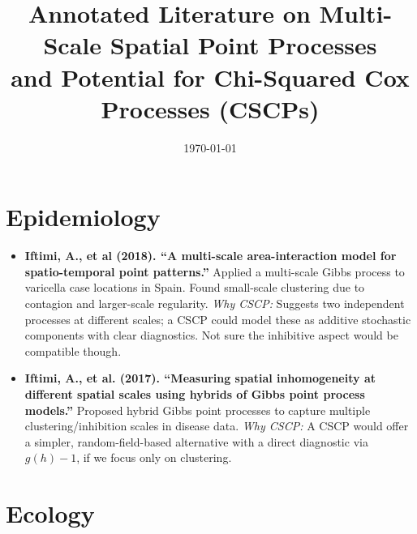 \documentclass[11pt]{article}
\title{Annotated Literature on Multi-Scale Spatial Point Processes \\ and Potential for Chi-Squared Cox Processes (CSCPs)}
\author{}
\date{\today}
\begin{document}
	\maketitle
	
	\section*{Epidemiology}
	
	\begin{itemize}
		\item \textbf{Iftimi, A., et al (2018). ``A multi-scale area-interaction model for spatio-temporal point patterns.''}  
		Applied a multi-scale Gibbs process to varicella case locations in Spain. Found small-scale clustering due to contagion and larger-scale regularity.  
		\emph{Why CSCP:} Suggests two independent processes at different scales; a CSCP could model these as additive stochastic components with clear diagnostics. Not sure the inhibitive aspect would be compatible though.
		
		\item \textbf{Iftimi, A., et al. (2017). ``Measuring spatial inhomogeneity at different spatial scales using hybrids of Gibbs point process models.''}  
		Proposed hybrid Gibbs point processes to capture multiple clustering/inhibition scales in disease data.  
		\emph{Why CSCP:} A CSCP would offer a simpler, random-field-based alternative with a direct diagnostic via $g(h)-1$, if we focus only on clustering.
	\end{itemize}
	
	\section*{Ecology}
	
\end{document}
